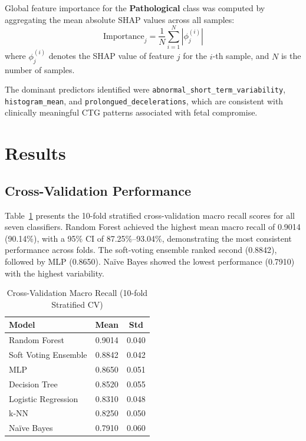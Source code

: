 \documentclass[sigconf]{acmart}
\begin{document}
Global feature importance for the \textbf{Pathological} class was computed by aggregating the mean absolute SHAP values across all samples:
\begin{equation}
\label{eq:shap_importance}
\text{Importance}_j = \frac{1}{N} \sum_{i=1}^{N} \left| \phi_j^{(i)} \right|
\end{equation}
where $\phi_j^{(i)}$ denotes the SHAP value of feature $j$ for the $i$-th sample, and $N$ is the number of samples.

The dominant predictors identified were \texttt{abnormal\_short\_term\_variability}, \texttt{histogram\_mean}, and \texttt{prolongued\_decelerations}, which are consistent with clinically meaningful CTG patterns associated with fetal compromise.
\section{Results}
\label{sec:results}

\subsection{Cross-Validation Performance}
\label{subsec:cv}

Table~\ref{tab:cv} presents the 10-fold stratified cross-validation macro recall scores for all seven classifiers. Random Forest achieved the highest mean macro recall of 0.9014 (90.14\%), with a 95\% CI of 87.25\%--93.04\%, demonstrating the most consistent performance across folds. The soft-voting ensemble ranked second (0.8842), followed by MLP (0.8650). Na\"{i}ve Bayes showed the lowest performance (0.7910) with the highest variability.

\begin{table}[t]
\centering
\caption{Cross-Validation Macro Recall (10-fold Stratified CV)}
\label{tab:cv}
\begin{tabular}{lcc}
\toprule
\textbf{Model} & \textbf{Mean} & \textbf{Std} \\
\midrule
Random Forest        & 0.9014 & 0.040 \\
Soft Voting Ensemble & 0.8842 & 0.042 \\
MLP                  & 0.8650 & 0.051 \\
Decision Tree        & 0.8520 & 0.055 \\
Logistic Regression  & 0.8310 & 0.048 \\
k-NN                 & 0.8250 & 0.050 \\
Na\"{i}ve Bayes      & 0.7910 & 0.060 \\
\bottomrule
\end{tabular}
\end{table}
\end{document}
